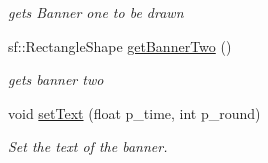 \begin{DoxyCompactItemize}
\begin{DoxyCompactList}\small\item\em gets Banner one to be drawn \end{DoxyCompactList}\item 
\mbox{\label{class_h_u_d_ae6404014443fc158fc077b35a62d8135}} 
sf\+::\+Rectangle\+Shape \mbox{\hyperlink{class_h_u_d_ae6404014443fc158fc077b35a62d8135}{get\+Banner\+Two}} ()
\begin{DoxyCompactList}\small\item\em gets banner two \end{DoxyCompactList}\item 
\mbox{\label{class_h_u_d_adbe82ce95dbbf4b8aa2e05bf13d66685}} 
void \mbox{\hyperlink{class_h_u_d_adbe82ce95dbbf4b8aa2e05bf13d66685}{set\+Text}} (float p\+\_\+time, int p\+\_\+round)
\begin{DoxyCompactList}\small\item\em Set the text of the banner. \end{DoxyCompactList}\end{DoxyCompactItemize}
